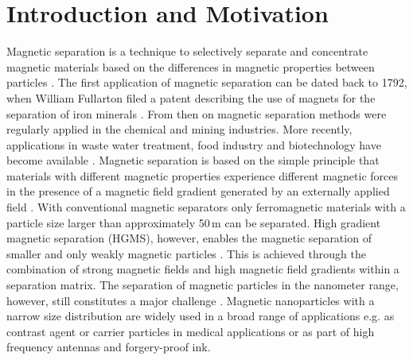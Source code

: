 
\chapter{Introduction and Motivation}
\label{ch:Introduction}
Magnetic separation is a technique to selectively separate and concentrate magnetic materials based on the differences in magnetic properties between particles \cite{ge2017magnetic}. 
The first application of magnetic separation can be dated back to 1792, when William Fullarton filed a patent describing the use of magnets for the separation of iron minerals \cite{1794repertory}. From then on magnetic separation methods were regularly applied in the chemical and mining industries. More recently, applications in waste water treatment, food industry and biotechnology have become available \cite{yavuz2009magnetic}. Magnetic separation is based on the simple principle that materials with different magnetic properties experience different magnetic forces in the presence of a magnetic field gradient generated by an externally applied field \cite{svoboda2004magnetic}. With conventional magnetic separators only ferromagnetic materials with a particle size larger than approximately 50\,\textmu m can be separated. High gradient magnetic separation (HGMS), however, enables the magnetic separation of smaller and only weakly magnetic particles \cite{frantz1937patent,ge2017magnetic}. This is achieved through the combination of strong magnetic fields and high magnetic field gradients within a separation matrix. The separation of magnetic particles in the nanometer range, however, still constitutes a major challenge \cite{mandel2012magnetic}. Magnetic nanoparticles with a narrow size distribution are widely used in a broad range of applications e.g. as contrast agent or carrier particles in medical applications or as part of high frequency antennas and forgery-proof ink.

